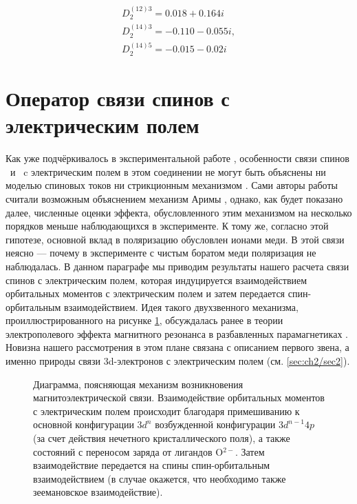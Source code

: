 \begin{equation}
	\label{eq:Dparams}
	\begin{array}{l}
		D_{2}^{(12) 3}=0.018+0.164 i   \\
		D_{2}^{(14) 3}=-0.110-0.055 i, \\
		D_{2}^{(14) 5}=-0.015-0.02 i
	\end{array}
\end{equation}

\section{Оператор связи спинов с электрическим полем}\label{sec:ch2/sec3}

Как уже подчёркивалось в экспериментальной работе \cite{Khanh2013}, особенности связи спинов \cu\ и \niIon\ c электрическим полем в этом соединении не могут быть объяснены ни моделью спиновых токов \cite{Katsura2005} ни стрикционным механизмом \cite{Sergienko2006}. Сами авторы работы \cite{Khanh2013} считали возможным объяснением механизм Аримы \cite{Arima2007}, однако, как будет показано далее, численные оценки эффекта, обусловленного этим механизмом на несколько порядков меньше наблюдающихся в эксперименте. К тому же, согласно этой гипотезе, основной вклад в поляризацию обусловлен ионами меди. В этой связи неясно --- почему в эксперименте с чистым боратом меди \cite{Nenert2007} поляризация не наблюдалась. 
В данном параграфе мы приводим результаты нашего расчета связи спинов с электрическим полем, которая индуцируется взаимодействием орбитальных моментов с электрическим полем и затем передается спин-орбитальным взаимодействием. Идея такого двухзвенного механизма, проиллюстрированного на рисунке \cref{fig:perturbation_model}, обсуждалась ранее в теории электрополевого эффекта магнитного резонанса в разбавленных парамагнетиках \cite{Mims}. Новизна нашего рассмотрения в этом плане связана с описанием первого звена, а именно природы связи 3d-электронов с электрическим полем (см. \cref{sec:ch2/sec2}). 

\begin{figure}[ht]
	\caption{Диаграмма, поясняющая механизм возникновения магнитоэлектрической связи. Взаимодействие орбитальных моментов с электрическим полем происходит благодаря примешиванию к основной конфигурации \(3d^n\) возбужденной конфигурации \(3d^{n-1}4p\) (за счет действия нечетного кристаллического поля), а также состояний с переносом заряда от лигандов O\(^{2-}\). Затем взаимодействие передается на спины  спин-орбитальным взаимодействием (в случае \cu окажется, что необходимо также зеемановское взаимодействие).}
	\label{fig:perturbation_model}
\end{figure}


